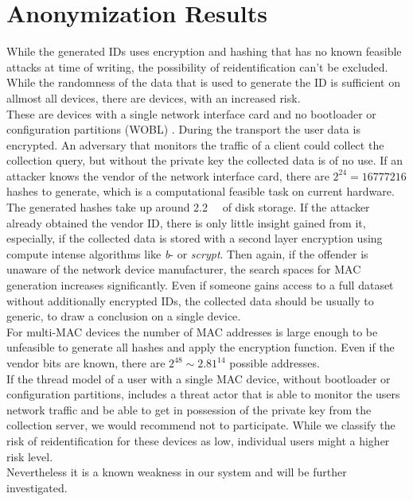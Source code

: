 %
\newpage
%
 


\section{Anonymization Results}
\label{sec:results:anon}
    While the generated IDs uses encryption and hashing that has no known feasible attacks at time of writing, the possibility of reidentification can't be excluded. While the randomness of the data that is used to generate the ID is sufficient on allmost all devices, there are devices, with an increased risk.\\
    These are devices with a single network interface card and no bootloader or configuration partitions (WOBL) . During the transport the user data is encrypted. An adversary that monitors the traffic of a client could collect the collection query, but without the private key the collected data is of no use. If an attacker knows the vendor of the network interface card, there are $2^{24} = 16777216$ hashes to generate, which is a computational feasible task on current hardware. The generated hashes take up around \SIlist{2.2}{\giga\byte} of disk storage.
    If the attacker already obtained the vendor ID, there is only little insight gained from it, especially, if the collected data is stored with a second layer encryption using compute intense algorithms like \textit{b}- or \textit{scrypt}. 
    Then again, if the offender is unaware of the network device manufacturer, the search spaces for MAC generation increases significantly. Even if someone gains access to a full dataset without additionally encrypted IDs, the collected data should be usually to generic,  to draw a conclusion on a single device.\\
    For multi-MAC devices the number of MAC addresses is large enough to be unfeasible to generate all hashes and apply the encryption function. Even if the vendor bits are known, there are $2^48 \sim 2.81^{14}$ possible addresses.\\
    If the thread model of a user with a single MAC device, without bootloader or configuration partitions, includes a threat actor that is able to monitor the users network traffic and be able to get in possession of the private key from the collection server, we would recommend not to participate. While we classify the risk of reidentification for these devices as low, individual users might a higher risk level.\\
    Nevertheless it is a known weakness in our system and will be further investigated.\\
    
